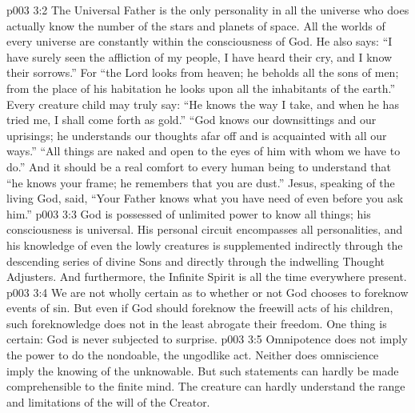\vs p003 3:2 The Universal Father is the only personality in all the universe who does actually know the number of the stars and planets of space. All the worlds of every universe are constantly within the consciousness of God. He also says: “I have surely seen the affliction of my people, I have heard their cry, and I know their sorrows.” For “the Lord looks from heaven; he beholds all the sons of men; from the place of his habitation he looks upon all the inhabitants of the earth.” Every creature child may truly say: “He knows the way I take, and when he has tried me, I shall come forth as gold.” “God knows our downsittings and our uprisings; he understands our thoughts afar off and is acquainted with all our ways.” “All things are naked and open to the eyes of him with whom we have to do.” And it should be a real comfort to every human being to understand that “he knows your frame; he remembers that you are dust.” Jesus, speaking of the living God, said, “Your Father knows what you have need of even before you ask him.”
\vs p003 3:3 God is possessed of unlimited power to know all things; his consciousness is universal. His personal circuit encompasses all personalities, and his knowledge of even the lowly creatures is supplemented indirectly through the descending series of divine Sons and directly through the indwelling Thought Adjusters. And furthermore, the Infinite Spirit is all the time everywhere present.
\vs p003 3:4 We are not wholly certain as to whether or not God chooses to foreknow events of sin. But even if God should foreknow the freewill acts of his children, such foreknowledge does not in the least abrogate their freedom. One thing is certain: God is never subjected to surprise.
\vs p003 3:5 \pc Omnipotence does not imply the power to do the nondoable, the ungodlike act. Neither does omniscience imply the knowing of the unknowable. But such statements can hardly be made comprehensible to the finite mind. The creature can hardly understand the range and limitations of the will of the Creator.
